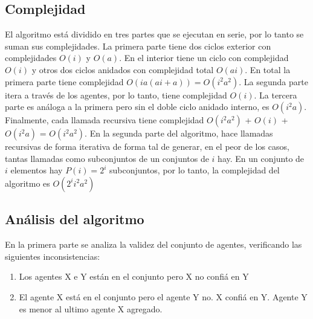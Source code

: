 \documentclass{article}
\begin{document}
\subsection{Complejidad}

El algoritmo está dividido en tres partes que se ejecutan en serie, por lo tanto se suman sus complejidades. La primera parte tiene dos ciclos exterior con complejidades $O(i)$ y $O(a)$. En el interior tiene un ciclo con complejidad $O(i)$ y otros dos ciclos anidados con complejidad total $O(a i)$. En total la primera parte tiene complejidad $O(i a (a i + a)) = O(i^2 a^2)$.
La segunda parte itera a través de los agentes, por lo tanto, tiene complejidad $O(i)$.
La tercera parte es análoga a la primera pero sin el doble ciclo anidado interno, es $O(i^2 a)$. Finalmente, cada llamada recursiva tiene complejidad $O(i^2 a^2)$ + $O(i)$ + $O(i^2 a)$ = $O(i^2 a^2)$.
En la segunda parte del algoritmo, hace llamadas recursivas de forma iterativa de forma tal de generar, en el peor de los casos, tantas llamadas como subconjuntos de un conjuntos de $i$ hay. En un conjunto de $i$ elementos hay $P(i) = 2^i$ subconjuntos, por lo tanto, la complejidad del algoritmo es $O(2^i i^2 a^2)$

\subsection{Análisis del algoritmo}

En la primera parte se analiza la validez del conjunto de agentes, verificando las siguientes inconsistencias:

\begin{enumerate}
	\item Los agentes X e Y están en el conjunto pero X no confiá en Y
	\item El agente X está en el conjunto pero el agente Y no. X confiá en Y. Agente Y es menor al ultimo agente X agregado.
\end{enumerate}
\end{document}
